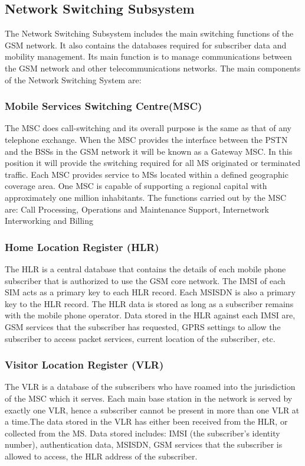 \subsection{Network Switching Subsystem}
The Network Switching Subsystem includes
the main switching functions of the GSM network. It also contains the databases
required for subscriber data and mobility management. Its main function is
to manage communications between the GSM network and other telecommunications
networks. The main components of the Network Switching System are:


\subsubsection*{Mobile Services Switching Centre(MSC)}
The MSC does call-switching
and its overall purpose is the same as that of any telephone exchange. When
the MSC provides the interface between the PSTN and the BSSs in the GSM
network it will be known as a Gateway MSC. In this position it will provide
the switching required for all MS originated or terminated traffic. Each
MSC provides service to MSs located within a defined geographic coverage
area. One MSC is capable of supporting a regional capital with approximately
 one million inhabitants.
The functions carried out by the MSC are: Call Processing, Operations and
Maintenance Support, Internetwork Interworking and Billing

\subsubsection*{Home Location Register (HLR)}
The HLR is a central database that contains the details of each mobile phone
subscriber that is authorized to use the GSM core network. The IMSI of
each SIM acts as a primary key to each HLR record. Each MSISDN is
also a primary key to the HLR record. The HLR data is stored
as long as a subscriber remains with the mobile phone operator.
Data stored in the HLR against each IMSI are, GSM services that the
subscriber has requested, GPRS settings to allow the subscriber to
access packet services, current location of the subscriber, etc.

\subsubsection*{Visitor Location Register (VLR)}
The VLR is a database of the subscribers who have roamed into the jurisdiction
of the MSC which it serves. Each main base station in the network is served by
exactly one VLR, hence a subscriber cannot be present in more than
one VLR at a time.The data stored in the VLR has either been received
from the HLR, or collected from the MS. Data stored includes: IMSI
(the subscriber's identity number), authentication data, MSISDN,
GSM services that the subscriber is allowed to access, the HLR address
of the subscriber.



